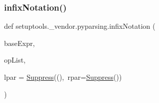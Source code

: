  \mbox{\label{namespacesetuptools_1_1__vendor_1_1pyparsing_a929a2b2bcc0fb4b63624e72f021cc266}} 
\subsubsection{\texorpdfstring{infix\+Notation()}{infixNotation()}}
{\footnotesize\ttfamily def setuptools.\+\_\+vendor.\+pyparsing.\+infix\+Notation (\begin{DoxyParamCaption}\item[{}]{base\+Expr,  }\item[{}]{op\+List,  }\item[{}]{lpar = {\ttfamily \hyperlink{classsetuptools_1_1__vendor_1_1pyparsing_1_1Suppress}{Suppress}(\textquotesingle{}(\textquotesingle{}),~rpar=\hyperlink{classsetuptools_1_1__vendor_1_1pyparsing_1_1Suppress}{Suppress}(\textquotesingle{})\textquotesingle{})} }\end{DoxyParamCaption})}


